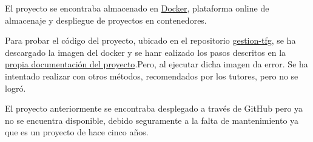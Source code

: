 El proyecto se encontraba almacenado en \href{https://www.docker.com/}{Docker}, plataforma online de almacenaje y despliegue de proyectos en contenedores. 

Para probar el código del proyecto, ubicado en el repositorio \href{https://github.com/gabriel-stan/gestion-tfg}{gestion-tfg}, se ha descargado la imagen del docker y se hanr ealizado los pasos descritos en la \href{https://github.com/gabriel-stan/gestion-tfg/blob/master/docs/README-contenerizacion.md}{propia documentación del proyecto}.Pero, al ejecutar dicha imagen da error. Se ha intentado realizar con otros métodos, recomendados por los tutores, pero no se logró.

El proyecto anteriormente se encontraba desplegado a través de GitHub pero ya no se encuentra disponible, debido seguramente a la falta de mantenimiento ya que es un proyecto de hace cinco años. 


                                                                                                                                





